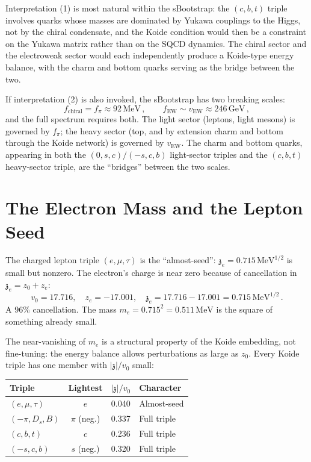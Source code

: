 \documentclass[12pt,a4paper]{article}
\newcommand{\MeV}{\,\text{MeV}}
\newcommand{\GeV}{\,\text{GeV}}
\newcommand{\zch}{\mathfrak{z}}
\begin{document}
Interpretation (1) is most natural within the sBootstrap: the 
$(c,b,t)$ triple involves quarks whose masses are dominated by 
Yukawa couplings to the Higgs, not by the chiral condensate, and the 
Koide condition would then be a constraint on the Yukawa matrix 
rather than on the SQCD dynamics. The chiral sector and the 
electroweak sector would each independently produce a Koide-type 
energy balance, with the charm and bottom quarks serving as the 
bridge between the two.

If interpretation (2) is also invoked, the sBootstrap has two breaking 
scales:
\begin{equation}
f_{\text{chiral}} = f_\pi \approx 92\MeV\,, \qquad
f_{\text{EW}} \sim v_{\text{EW}} \approx 246\GeV\,,
\end{equation}
and the full spectrum requires both. The light sector (leptons, 
light mesons) is governed by $f_\pi$; the heavy sector (top, and 
by extension charm and bottom through the Koide network) is 
governed by $v_{\text{EW}}$. The charm and bottom quarks, 
appearing in both the $(0,s,c)/(-s,c,b)$ light-sector triples 
and the $(c,b,t)$ heavy-sector triple, are the ``bridges'' 
between the two scales.

\section{The Electron Mass and the Lepton Seed}
\label{sec:electron}

The charged lepton triple $(e, \mu, \tau)$ is the ``almost-seed'': 
$\zch_e = 0.715\MeV^{1/2}$ is small but nonzero. The electron's 
charge is near zero because of cancellation in $\zch_e = z_0 + z_e$:
\begin{equation}
v_0 = 17.716, \quad z_e = -17.001, \quad 
\zch_e = 17.716 - 17.001 = 0.715\MeV^{1/2}\,.
\end{equation}
A 96\% cancellation. The mass $m_e = 0.715^2 = 0.511\MeV$ is the 
square of something already small.

The near-vanishing of $m_e$ is a structural property of the Koide 
embedding, not fine-tuning: the energy balance allows perturbations 
as large as $z_0$. Every Koide triple has one member with 
$|\zch|/v_0$ small:

\begin{center}
\begin{tabular}{lccl}
\toprule
Triple & Lightest & $|\zch|/v_0$ & Character \\
\midrule
$(e, \mu, \tau)$ & $e$ & 0.040 & Almost-seed \\
$(-\pi, D_s, B)$ & $\pi$ (neg.) & 0.337 & Full triple \\
$(c, b, t)$ & $c$ & 0.236 & Full triple \\
$(-s, c, b)$ & $s$ (neg.) & 0.320 & Full triple \\
\bottomrule
\end{tabular}
\end{center}
\end{document}
